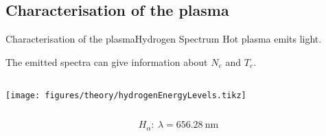 \documentclass[dvipsnames]{beamer}
\begin{document}
\subsection{Characterisation of the plasma}
\begin{frame}{Characterisation of the plasma}{Hydrogen Spectrum}
Hot plasma emits light.

The emitted spectra can give information about $N_e$ and $T_e$.
\begin{columns}
 \texttt{[image: figures/theory/hydrogenEnergyLevels.tikz]}
\end{columns}
$$H_{\alpha}:\ \lambda=\SI{656.28}{\nm}
$$
\end{frame}
% 
% 
%   
\end{document}
